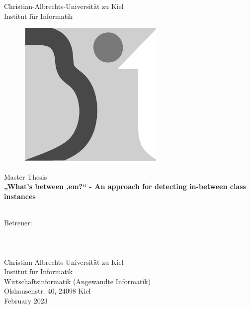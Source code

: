 \documentclass[11pt]{article}
\theoremstyle{definition}
\begin{document}
\begin{center}
    \huge{Christian-Albrechts-Universität zu Kiel} \\[10pt]
    \large{Institut für Informatik}\\[40pt]
\end{center}

\begin{figure}[H]
\centering
\includegraphics[scale=0.7]{images/faculty.png}\\[40pt]
\end{figure}
\begin{center}
    \huge{Master Thesis} \\[10pt]
    \textbf{ „What’s between ‚em?“ - An approach for detecting in-between class instances}\\[10pt]
    \\[20pt]
\end{center}

\begin{center}
    \large{Betreuer:}\\[10pt]
    \\[10pt]
    \\[10pt]
    \\[10pt]
     Christian-Albrechts-Universität zu Kiel\\
     Institut für Informatik\\
     Wirtschaftsinformatik (Angewandte Informatik)\\
     Olshausenstr. 40, 24098 Kiel\\[10pt]
     \Large{February 2023}\\[50pt]
\end{center}
\end{document}
